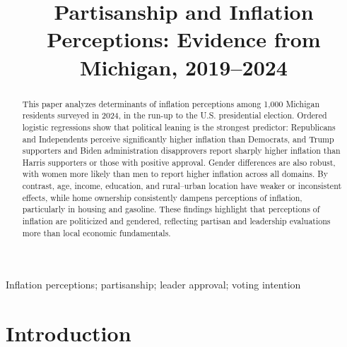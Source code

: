 \documentclass[]{interact}
\theoremstyle{plain}%
\theoremstyle{definition}
\theoremstyle{remark}
\begin{document}

\title{Partisanship and Inflation Perceptions: Evidence from Michigan, 2019–2024}

\author{
}

\maketitle

\begin{abstract}
This paper analyzes determinants of inflation perceptions among 1,000 Michigan residents surveyed in 2024, in the run-up to the U.S. presidential election. Ordered logistic regressions show that political leaning is the strongest predictor: Republicans and Independents perceive significantly higher inflation than Democrats, and Trump supporters and Biden administration disapprovers report sharply higher inflation than Harris supporters or those with positive approval. Gender differences are also robust, with women more likely than men to report higher inflation across all domains. By contrast, age, income, education, and rural–urban location have weaker or inconsistent effects, while home ownership consistently dampens perceptions of inflation, particularly in housing and gasoline. These findings highlight that perceptions of inflation are politicized and gendered, reflecting partisan and leadership evaluations more than local economic fundamentals.

\end{abstract}

\begin{keywords}
Inflation perceptions; partisanship; leader approval; voting intention
\end{keywords}




\section*{Introduction}
\end{document}
